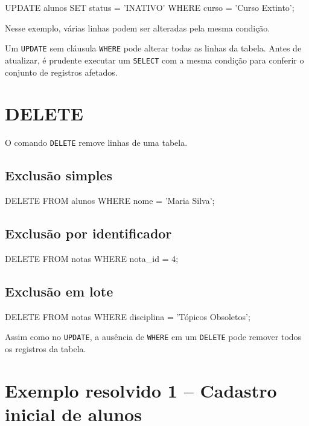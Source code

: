 \begin{sqlcode}
UPDATE alunos
SET status = 'INATIVO'
WHERE curso = 'Curso Extinto';
\end{sqlcode}

Nesse exemplo, várias linhas podem ser alteradas pela mesma condição.

\begin{danger}
Um \texttt{UPDATE} sem cláusula \texttt{WHERE} pode alterar todas as linhas da tabela. Antes de atualizar, é prudente executar um \texttt{SELECT} com a mesma condição para conferir o conjunto de registros afetados.
\end{danger}

\section{DELETE}

O comando \texttt{DELETE} remove linhas de uma tabela.

\subsection{Exclusão simples}

\begin{sqlcode}
DELETE FROM alunos
WHERE nome = 'Maria Silva';
\end{sqlcode}

\subsection{Exclusão por identificador}

\begin{sqlcode}
DELETE FROM notas
WHERE nota_id = 4;
\end{sqlcode}

\subsection{Exclusão em lote}

\begin{sqlcode}
DELETE FROM notas
WHERE disciplina = 'Tópicos Obsoletos';
\end{sqlcode}

\begin{danger}
Assim como no \texttt{UPDATE}, a ausência de \texttt{WHERE} em um \texttt{DELETE} pode remover todos os registros da tabela.
\end{danger}

\section{Exemplo resolvido 1 -- Cadastro inicial de alunos}


